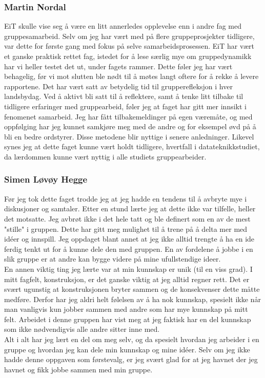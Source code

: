 \subsubsection{Martin Nordal}
EiT skulle vise seg å være en litt annerledes opplevelse enn i andre fag med gruppesamarbeid.
Selv om jeg har vært med på flere gruppeprosjekter tidligere, var dette for første gang med fokus på selve samarbeidsprosessen.
EiT har vært et ganske praktisk rettet fag, istedet for å lese særlig mye om gruppedynamikk har vi heller testet det ut, under fagets rammer.
Dette føler jeg har vært behagelig, før vi mot slutten ble nødt til å møtes langt oftere for å rekke å levere rapportene.
Det har vært satt av betydelig tid til grupperefleksjon i hver landsbydag.
Ved å aktivt bli satt til å reflektere, samt å tenke litt tilbake til tidligere erfaringer med gruppearbeid, føler jeg at faget har gitt mer innsikt i fenomenet samarbeid.
Jeg har fått tilbakemeldinger på egen væremåte, og med oppfølging har jeg kunnet samkjøre meg med de andre og for eksempel øvd på å bli en bedre ordstyrer. Disse metodene blir nyttige i senere anledninger.
Likevel synes jeg at dette faget kunne vært holdt tidligere, hvertfall i datateknikkstudiet, da lærdommen kunne vært nyttig i alle studiets gruppearbeider.\\

\subsubsection{Simen Løvøy Hegge}
Før jeg tok dette faget trodde jeg at jeg hadde en tendens til å avbryte mye i diskusjoner og samtaler.
Etter en stund lærte jeg at dette ikke var tilfelle, heller det motsatte.
Jeg avbrøt ikke i det hele tatt og ble definert som en av de mest "stille" i gruppen.
Dette har gitt meg mulighet til å trene på å delta mer med id\'{e}er og innspill.
Jeg oppdaget blant annet at jeg ikke alltid trengte å ha en ide ferdig tenkt ut for å kunne dele den med gruppen.
En av fordelene å jobbe i en slik gruppe er at andre kan bygge videre på mine ufullstendige ideer.\\

En annen viktig ting jeg lærte var at min kunnskap er unik (til en viss grad).
I mitt fagfelt, konstruksjon, er det ganske viktig at jeg alltid regner rett.
Det er svært ugunstig at konstruksjonen bryter sammen og de konsekvenser dette måtte medføre.
Derfor har jeg aldri helt følelsen av å ha nok kunnskap, spesielt ikke når man vanligvis kun jobber sammen med andre som har mye kunnskap på mitt felt.
Arbeidet i denne gruppen har vist meg at jeg faktisk har en del kunnskap som ikke nødvendigvis alle andre sitter inne med. \\

Alt i alt har jeg lært en del om meg selv, og da spesielt hvordan jeg arbeider i en gruppe og hvordan jeg kan dele min kunnskap og mine id\'{e}er.
Selv om jeg ikke hadde denne oppgaven som førstevalg, er jeg svært glad for at jeg havnet der jeg havnet og fikk jobbe sammen med min gruppe. \\
